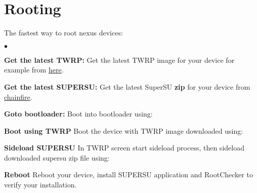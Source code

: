 \section{Rooting}
The fastest way to root nexus devices:

\begin{list}{$\bullet$}{}
	\item {\textbf{Get the latest TWRP:}} 
		Get the latest TWRP image for your device for example from \href{http://techerrata.com/browse/twrp2/hammerhead}{here}.
	\item {\textbf{Get the latest SUPERSU:}} 
		Get the latest SuperSU \textbf{zip} for your device from \href{http://download.chainfire.eu/696/SuperSU/}{chainfire}.
	\item {\textbf{Goto bootloader:}} 
		Boot into bootloader using: 
	\item {\textbf{Boot using TWRP}} 
		Boot the device with TWRP image 	downloaded using:\newline {}
	\item {\textbf{Sideload SUPERSU}} 
		In TWRP screen start sideload process, then sideload downloaded supersu zip file using: 
	\item {\textbf{Reboot}} Reboot your device, install SUPERSU application and RootChecker to verify your installation.
\end{list}